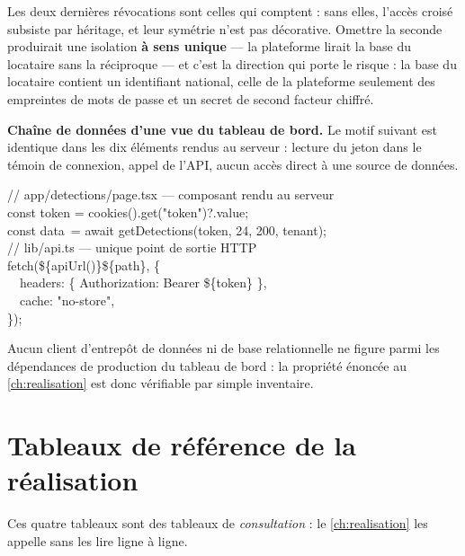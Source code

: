 Les deux dernières révocations sont celles qui comptent : sans elles, l'accès croisé subsiste par
héritage, et leur symétrie n'est pas décorative. Omettre la seconde produirait une isolation
\textbf{à sens unique} --- la plateforme lirait la base du locataire sans la réciproque --- et c'est
la direction qui porte le risque : la base du locataire contient un identifiant national, celle de
la plateforme seulement des empreintes de mots de passe et un secret de second facteur chiffré.

\textbf{Chaîne de données d'une vue du tableau de bord.} Le motif suivant est identique dans les
dix éléments rendus au serveur : lecture du jeton dans le témoin de connexion, appel de l'API,
aucun accès direct à une source de données.

\begin{extraitconf}[boxsep=1pt, left=3pt, right=3pt, top=2pt, bottom=2pt]
// app/detections/page.tsx --- composant rendu au serveur\\
const token = cookies().get("token")?.value;\\
const data\ = await getDetections(token, 24, 200, tenant);\\[0.4em]
// lib/api.ts --- unique point de sortie HTTP\\
fetch(\textasciigrave\$\{apiUrl()\}\$\{path\}\textasciigrave, \{\\
\ \ headers: \{ Authorization: \textasciigrave Bearer \$\{token\}\textasciigrave{} \},\\
\ \ cache: "no-store",\\
\});
\end{extraitconf}

Aucun client d'entrepôt de données ni de base relationnelle ne figure parmi les dépendances de
production du tableau de bord : la propriété énoncée au \cref{ch:realisation} est donc
vérifiable par simple inventaire.

\section{Tableaux de référence de la réalisation}
\label{ann:tableaux-realisation}

Ces quatre tableaux sont des tableaux de \emph{consultation} : le \cref{ch:realisation} les
appelle sans les lire ligne à ligne.

